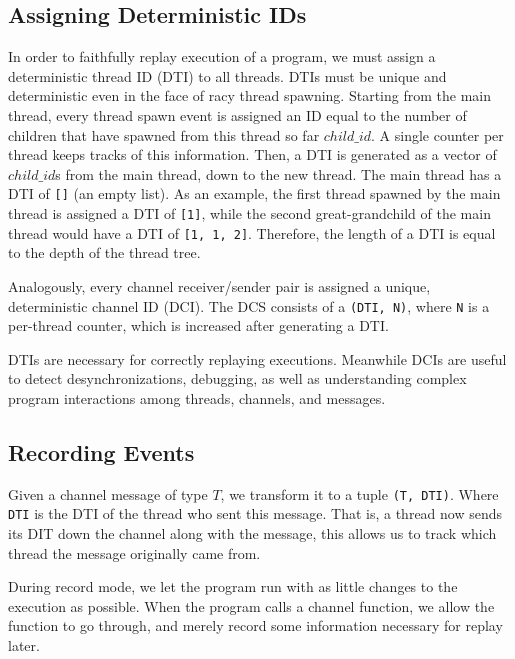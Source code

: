 \documentclass{article}
\begin{document}
\subsection{Assigning Deterministic IDs}
In order to faithfully replay execution of a program, we must assign a deterministic
thread ID (DTI) to all threads. DTIs must be unique and deterministic
even in the face of racy thread spawning. Starting from the main thread,
every thread spawn event is assigned an ID equal to the number of children that
have spawned from this thread so far $child\_id$. A single counter per thread keeps tracks of this information. Then, a DTI is generated as a vector of $child\_id$s from the main thread, down to the new thread. The main thread has a DTI of \texttt{[]} (an empty list). As an example, the first thread spawned by the main thread is assigned a DTI of \texttt{[1]}, while the second great-grandchild of the main thread would have a DTI of \texttt{[1, 1, 2]}. Therefore, the length of a DTI is equal to the depth of the thread tree.

Analogously, every channel receiver/sender pair is assigned a unique, deterministic channel ID (DCI).
The DCS consists of a \texttt{(DTI, N)}, where \texttt{N} is a per-thread
counter, which is increased after generating a DTI.

DTIs are necessary for correctly replaying executions. Meanwhile DCIs are useful to detect
desynchronizations, debugging, as well as understanding complex program interactions among
threads, channels, and messages.

\subsection{Recording Events}
Given a channel message of type $T$, we transform it to a tuple \texttt{(T, DTI)}. Where \texttt{DTI} is
the DTI of the thread who sent this message. That is, a thread now sends its DIT down
the channel along with the message, this allows us to track which thread the message
originally came from.

During record mode, we let the program run with as little changes to the execution as
possible. When the program calls a channel function, we allow the function to go through, and merely record some information necessary for replay later.
\end{document}
